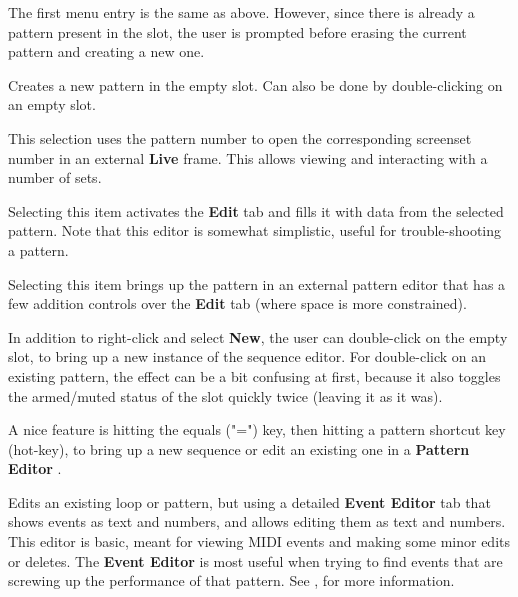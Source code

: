    The first menu entry is the same as above.  However, since there is
   already a pattern present in the slot, the user is prompted before erasing
   the current pattern and creating a new one.

   \setcounter{ItemCounter}{0}      %

   Creates a new pattern in the empty slot.
   Can also be done by double-clicking on an empty slot.

   This selection uses the pattern number to open the corresponding screenset
   number in an external \textbf{Live} frame.
   This allows viewing and interacting with a number of sets.

   Selecting this item activates the \textbf{Edit} tab and fills it with data
   from the selected pattern.
   Note that this editor is somewhat simplistic, useful for trouble-shooting a
   pattern.

   Selecting this item brings up the pattern in an external pattern editor that
   has a few addition controls over the \textbf{Edit} tab (where space is more
   constrained).

   In addition to right-click and select \textbf{New}, the user can
   double-click on the empty slot, to bring up a new instance of the sequence
   editor.  For double-click on an existing pattern,
   the effect can be a bit confusing at first,
   because it also toggles the armed/muted status of the slot
   quickly twice (leaving it as it was).


   A nice feature is hitting the equals ("=") key, then hitting
   a pattern shortcut key (hot-key), to bring up a new sequence or edit an
   existing one in a \textbf{Pattern Editor} .

   Edits an existing loop or pattern, but using a detailed \textbf{Event Editor}
   tab that shows events as text and numbers, and allows editing them as text
   and numbers.
   This editor is basic, meant for viewing
   MIDI events and making some minor edits or deletes.
   The \textbf{Event Editor} is most useful when trying to find events
   that are screwing up the performance of that pattern.
   See , for more information.

